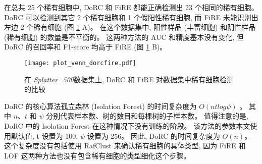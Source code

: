 在总共 25 个稀有细胞中, DoRC 和 FiRE 都能正确检测出 23 个相同的稀有细胞。
DoRC 可以检测到其它 2 个稀有细胞和 1 个假阳性稀有细胞,
而 FiRE 未能识别出左边 2 个稀有细胞 (图 \ref{fig:simulate:venn_auc_f1} A)。
在这个数据集中, 阳性样品 (丰富细胞) 和阴性样品 (稀有细胞) 的数量是不平衡的。
这两种方法的 AUC 和精度基本没有变化,
但 DoRC 的召回率和 F1-score 均高于 FiRE (图 \ref{fig:simulate:venn_auc_f1} B)。
\begin{figure}[!htbp]
    \centering
    \texttt{[image: plot\_venn\_dorcfire.pdf]}
    \caption{
    在 \textit{Splatter\_500}数据集上, DoRC 和 FiRE 对数据集中稀有细胞检测的比较
    }
    \label{fig:simulate:venn_auc_f1}
\end{figure}

DoRC 的核心算法孤立森林 (Isolation Forest) 的时间复杂度为 $O(ntlog\psi)$ 。
其中 $n$、$t$ 和 $\psi$ 分别代表样本数、树的数目和每棵树的子样本数。
值得注意的是, DoRC 中的 Isolation Forest 在这种情况下没有训练的阶段。
该方法的参数本文使用默认值, t 设置为 100, $\psi$ 设置为 256。
因此, DoRC 的时间复杂度为 $O(n)$。
这个复杂度没有包括使用 RafClust 来确认稀有细胞的具体类型,
因为 FiRE 和 LOF 这两种方法也没有包含稀有细胞的类型细化这个步骤。

